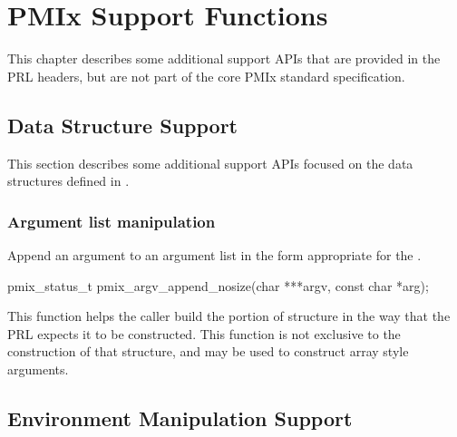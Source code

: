 \chapter{PMIx Support Functions}
\label{app:support}

This chapter describes some additional support APIs that are provided in the \ac{PRL} headers, but are not part of the core \ac{PMIx} standard specification.


\section{Data Structure Support}

This section describes some additional support APIs focused on the data structures defined in .

\subsection{Argument list manipulation}

\summary

Append an argument to an argument list in the form appropriate for the .

\cspecificstart
\begin{codepar}
pmix_status_t
pmix_argv_append_nosize(char ***argv, const char *arg);
\end{codepar}
\cspecificend

\begin{arglist}
\end{arglist}

\descr

This function helps the caller build the  portion of  structure in the way that the \ac{PRL} expects it to be constructed.
This function is not exclusive to the construction of that structure, and may be used to construct  array style arguments.


\section{Environment Manipulation Support}

